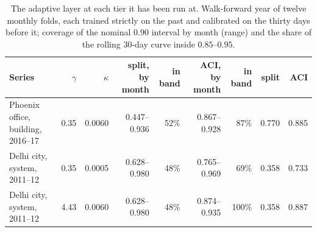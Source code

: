 \begin{table}[t]
\centering
\scriptsize
\setlength{\tabcolsep}{3pt}
\begin{tabular}{lrrrrrrrr}
\toprule
Series & $\gamma$ & $\kappa$ & split, by month & in band & ACI, by month & in band & split & ACI \\
\midrule
Phoenix office, building, 2016--17 & 0.35 & 0.0060 & 0.447--0.936 & 52\% & 0.867--0.928 & 87\% & 0.770 & 0.885 \\
Delhi city, system, 2011--12 & 0.35 & 0.0005 & 0.628--0.980 & 48\% & 0.765--0.969 & 69\% & 0.358 & 0.733 \\
Delhi city, system, 2011--12 & 4.43 & 0.0060 & 0.628--0.980 & 48\% & 0.874--0.935 & 100\% & 0.358 & 0.887 \\
\bottomrule
\end{tabular}
\caption{The adaptive layer at each tier it has been run at. Walk-forward year of twelve monthly folds, each trained strictly on the past and calibrated on the thirty days before it; coverage of the nominal $0.90$ interval by month (range) and the share of the rolling 30-day curve inside $0.85$--$0.95$.}
\label{tab:aci}
\end{table}
